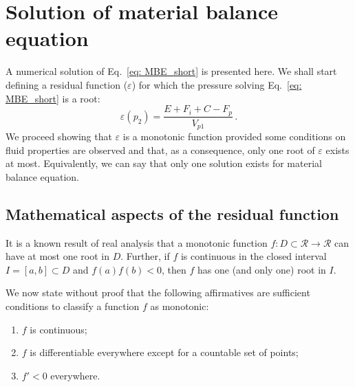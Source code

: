 \documentclass[authoryear,preprint,review,11pt]{elsarticle}
\begin{document}
\section{Solution of material balance equation}
A numerical solution of Eq.~\eqref{eq: MBE_short} is presented here. We shall start defining a residual function ($\varepsilon$) for which the pressure solving Eq.~\eqref{eq: MBE_short} is a root:
\begin{equation}\label{eq: residual}
\varepsilon(p_2) = \frac{E+F_i+C-F_p}{V_{p1}} \, .
\end{equation}
We proceed showing that $\varepsilon$ is a monotonic function provided some conditions on fluid properties are observed and that, as a consequence, only one root of $\varepsilon$ exists at most. Equivalently, we can say that only one solution exists for material balance equation.


\subsection{Mathematical aspects of the residual function}

It is a known result of real analysis that a monotonic function $f:D\subset\mathcal{R}\rightarrow\mathcal{R}$ can have at most one root in $D$. Further, if $f$ is continuous in the closed interval $I=[a,b] \subset D$ and $f(a)f(b)<0$, then $f$ has one (and only one) root in $I$.

We now state without proof that the following affirmatives are sufficient conditions to classify a function $f$ as monotonic:
\begin{enumerate}
\item $f$ is continuous;
\item $f$ is differentiable everywhere except for a countable set of points;
\item $f'<0$ everywhere.
\end{enumerate}
\end{document}
